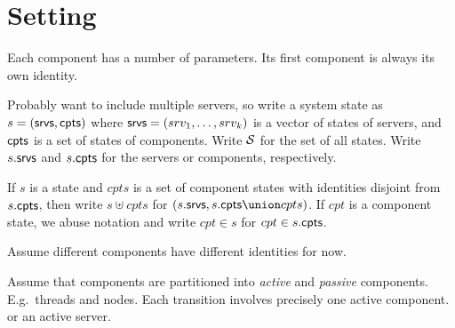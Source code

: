 
\section{Setting}

Each component has a number of parameters.  Its first component is always its
own identity. 

Probably want to include multiple servers, so write a system state as
$s = (\srv, \cpt)$ where $\srv = (srv_1, \ldots, srv_k)$ is a
vector of states of servers, and $\cpt$ is a set of states of
components.  Write $\S$ for the set of all states.  Write $s.\srv$ and $s.\cpt$
for the servers or components, respectively. 

If $s$ is a state and $cpts$ is a set of component states with identities
disjoint from $s.\cpt$, then write $s \uplus cpts$ for $(s.\srv, s.\cpt \union
cpts)$.  If $cpt$ is a component state, we abuse notation and write $cpt \in
s$ for $cpt \in s.\cpt$.

Assume different components have different identities for now. 

Assume that components are partitioned into \emph{active} and \emph{passive}
components.  E.g.~threads and nodes.  Each transition involves precisely one
active component.   or an active server. 
